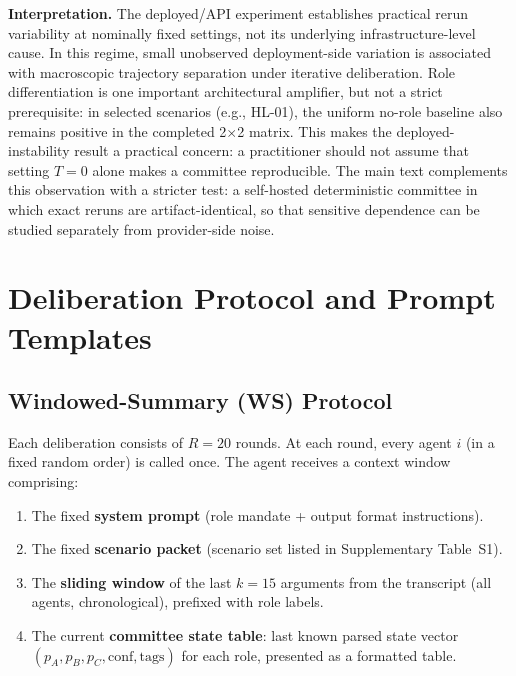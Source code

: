 \documentclass[11pt,onecolumn]{article}
\begin{document}
\textbf{Interpretation.}
The deployed/API experiment establishes practical rerun variability at nominally
fixed settings, not its underlying infrastructure-level cause. In this regime,
small unobserved deployment-side variation is associated with macroscopic
trajectory separation under iterative deliberation.
Role differentiation is one important architectural amplifier, but not a strict
prerequisite: in selected scenarios (e.g., HL-01), the uniform no-role
baseline also remains positive in the completed 2$\times$2 matrix.
This makes the deployed-instability result a practical concern: a practitioner
should not assume that setting $T = 0$ alone makes a committee reproducible.
The main text complements this observation with a stricter test: a self-hosted
deterministic committee in which exact reruns are artifact-identical, so that
sensitive dependence can be studied separately from provider-side noise.

\section{Deliberation Protocol and Prompt Templates}
\label{sec:S2-protocol}

\subsection{Windowed-Summary (WS) Protocol}

Each deliberation consists of $R = 20$ rounds.
At each round, every agent $i$ (in a fixed random order) is called once.
The agent receives a context window comprising:
\begin{enumerate}[noitemsep]
  \item The fixed \textbf{system prompt} (role mandate + output format instructions).
  \item The fixed \textbf{scenario packet} (scenario set listed in Supplementary Table~S1).
  \item The \textbf{sliding window} of the last $k = 15$ arguments from the
        transcript (all agents, chronological), prefixed with role labels.
  \item The current \textbf{committee state table}: last known parsed state
        vector $(p_A, p_B, p_C, \text{conf}, \text{tags})$ for each role,
        presented as a formatted table.
\end{enumerate}
\end{document}
